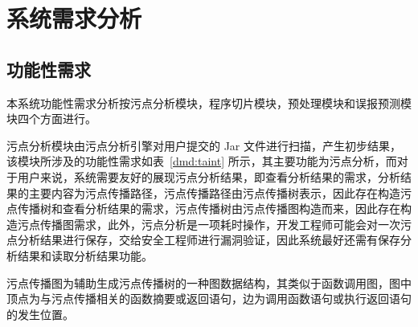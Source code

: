 \section{系统需求分析}\label{sec:demand}
\subsection{功能性需求}
本系统功能性需求分析按污点分析模块，程序切片模块，预处理模块和误报预测模块四个方面进行。

污点分析模块由污点分析引擎对用户提交的 Jar 文件进行扫描，产生初步结果，该模块所涉及的功能性需求如表~\ref{dmd:taint} 所示，其主要功能为污点分析，而对于用户来说，系统需要友好的展现污点分析结果，即查看分析结果的需求，分析结果的主要内容为污点传播路径，污点传播路径由污点传播树表示，因此存在构造污点传播树和查看分析结果的需求，污点传播树由污点传播图构造而来，因此存在构造污点传播图需求，此外，污点分析是一项耗时操作，开发工程师可能会对一次污点分析结果进行保存，交给安全工程师进行漏洞验证，因此系统最好还需有保存分析结果和读取分析结果功能。

\begin{definition}[污点传播图]
    污点传播图为辅助生成污点传播树的一种图数据结构，其类似于函数调用图，图中顶点为与污点传播相关的函数摘要或返回语句，边为调用函数语句或执行返回语句的发生位置。
\end{definition}

\setcounter{requireCounter}{1}

